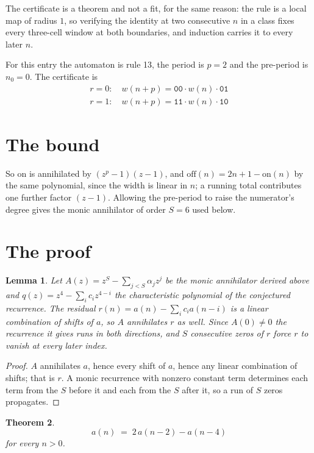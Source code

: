 \documentclass[11pt,a4paper]{article}
\theoremstyle{plain}
\newtheorem{theorem}{Theorem}
\newtheorem{lemma}[theorem]{Lemma}
\theoremstyle{definition}
\begin{document}
The certificate is a theorem and not a fit, for the same reason: the rule is a local map of
radius $1$, so verifying the identity at two consecutive $n$ in a class fixes every three-cell
window at both boundaries, and induction carries it to every later $n$.

For this entry the automaton is rule 13, the period is $p=2$ and the pre-period is $n_0=0$.
The certificate is
\begin{gather*}
r=0:\quad w(n+p) = \texttt{00} \cdot w(n) \cdot \texttt{01} \\
r=1:\quad w(n+p) = \texttt{11} \cdot w(n) \cdot \texttt{10}
\end{gather*}

\section{The bound}

So
$\mathrm{on}$ is annihilated by $(z^p-1)(z-1)$, and $\mathrm{off}(n)=2n+1-\mathrm{on}(n)$ by
the same polynomial, since the width is linear in $n$; a running total contributes one further
factor $(z-1)$. Allowing the pre-period to raise the numerator's degree gives the monic
annihilator of order $S=6$ used below.

\section{The proof}

\begin{lemma}\label{lem:crit}
Let $A(z)=z^S-\sum_{j<S}\alpha_jz^{j}$ be the monic annihilator derived above and
$q(z)=z^{4}-\sum_ic_iz^{4-i}$ the characteristic polynomial of the conjectured
recurrence. The residual $r(n)=a(n)-\sum_ic_ia(n-i)$ is a linear combination of shifts of $a$,
so $A$ annihilates $r$ as well. Since $A(0)\ne0$ the recurrence it gives runs in both
directions, and $S$ consecutive zeros of $r$ force $r$ to vanish at every later index.
\end{lemma}

\begin{proof}
$A$ annihilates $a$, hence every shift of $a$, hence any linear combination of shifts; that is
$r$. A monic recurrence with nonzero constant term determines each term from the $S$ before it
and each from the $S$ after it, so a run of $S$ zeros propagates.
\end{proof}

\begin{theorem}
\[
a(n)\;=\;2\,a(n-2) - a(n-4)
\]
for every $n>0$.
\end{theorem}
\end{document}
